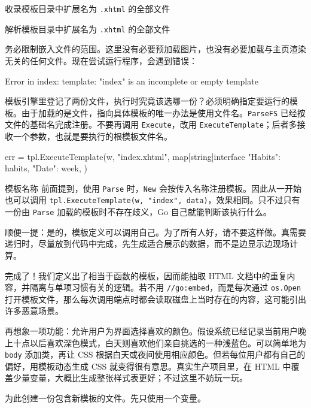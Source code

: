 \begin{codeannotations}
\item 收录模板目录中扩展名为 \texttt{.xhtml} 的全部文件
\item 解析模板目录中扩展名为 \texttt{.xhtml} 的全部文件
\end{codeannotations}

务必限制嵌入文件的范围。这里没有必要预加载图片，也没有必要加载与主页渲染无关的任何文件。现在尝试运行程序，会遇到错误：

\begin{shellcode}[]
Error in index: template: "index" is an incomplete or empty template
\end{shellcode}

模板引擎里登记了两份文件，执行时究竟该选哪一份？必须明确指定要运行的模板。由于加载的是文件，指向具体模板的唯一办法是使用文件名。\texttt{ParseFS} 已经按文件的基础名完成注册。不要再调用 \texttt{Execute}，改用 \texttt{ExecuteTemplate}；后者多接收一个参数，也就是要执行的根模板文件名。

\begin{gocode}[]
err = tpl.ExecuteTemplate(w, "index.xhtml", map[string]interface{}{
    "Habits": habits,
    "Date":   week,
})
\end{gocode}

\begin{infobox}{模板名称}
前面提到，使用 \texttt{Parse} 时，\texttt{New} 会按传入名称注册模板。因此从一开始也可以调用 \texttt{tpl.ExecuteTemplate(w, "index", data)}，效果相同。只不过只有一份由 \texttt{Parse} 加载的模板时不存在歧义，Go 自己就能判断该执行什么。
\end{infobox}

顺便一提：是的，模板定义可以调用自己。为了所有人好，请不要这样做。真需要递归时，尽量放到代码中完成，先生成适合展示的数据，而不是边显示边现场计算。

完成了！我们定义出了相当于函数的模板，因而能抽取 HTML 文档中的重复内容，并隔离与单项习惯有关的逻辑。若不用 \texttt{//go:embed}，而是每次通过 \texttt{os.Open} 打开模板文件，那么每次调用端点时都会读取磁盘上当时存在的内容，这可能引出许多恶意场景。

再想象一项功能：允许用户为界面选择喜欢的颜色。假设系统已经记录当前用户晚上十点以后喜欢深色模式，白天则喜欢他们亲自挑选的一种浅蓝色。可以简单地为 \texttt{body} 添加类，再让 CSS 根据白天或夜间使用相应颜色。但若每位用户都有自己的偏好，用模板动态生成 CSS 就变得很有意思。真实生产项目里，在 HTML 中覆盖少量变量，大概比生成整张样式表更好；不过这里不妨玩一玩。

为此创建一份包含新模板的文件。先只使用一个变量。

